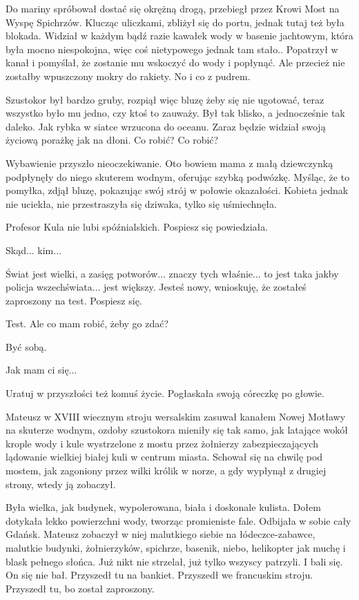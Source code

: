 Do mariny spróbował dostać się okrężną drogą, przebiegł przez Krowi Most na Wyspę Spichrzów.
Klucząc uliczkami, zbliżył się do portu, jednak tutaj też była blokada.
Widział w każdym bądź razie kawałek wody w basenie jachtowym, która była mocno niespokojna, więc coś nietypowego jednak tam stało..
Popatrzył w kanał i pomyślał, że zostanie mu wskoczyć do wody i popłynąć.
Ale przecież nie zostałby wpuszczony mokry do rakiety.
No i co z pudrem.

Szustokor był bardzo gruby, rozpiął więc bluzę żeby się nie ugotować, teraz wszystko było mu jedno, czy ktoś to zauważy.
Był tak blisko, a jednocześnie tak daleko.
Jak rybka w siatce wrzucona do oceanu.
Zaraz będzie widział swoją życiową porażkę jak na dłoni.
Co robić? Co robić?

Wybawienie przyszło nieoczekiwanie.
Oto bowiem mama z małą dziewczynką podpłynęły do niego skuterem wodnym, oferując szybką podwózkę.
Myśląc, że to pomyłka, zdjął bluzę, pokazując swój strój w połowie okazałości.
Kobieta jednak nie uciekła, nie przestraszyła się dziwaka, tylko się uśmiechnęła.

\ds{} Profesor Kula nie lubi spóźnialskich. Pospiesz się \dm{} powiedziała. \de{}

\ds{} Skąd... kim... \de{}

\ds{} Świat jest wielki, a zasięg potworów... znaczy tych właśnie... to jest taka jakby policja wszechświata... jest większy.
Jesteś nowy, wnioskuję, że zostałeś zaproszony na test. Pospiesz się.\de{}

\ds{} Test. Ale co mam robić, żeby go zdać? \de{}

\ds{} Być sobą. \de{}

\ds{} Jak mam ci się... \de{}

\ds{} Uratuj w przyszłości też komuś życie. \dm{} Pogłaskała swoją córeczkę po głowie. \de{}

Mateusz w XVIII wiecznym stroju wersalskim zasuwał kanałem Nowej Motławy na skuterze wodnym, ozdoby szustokora mieniły się tak samo, jak latające wokół 
krople wody i kule wystrzelone z mostu przez żołnierzy zabezpieczających
lądowanie wielkiej białej kuli w centrum miasta. 
Schował się na chwilę pod mostem, jak zagoniony przez wilki królik w norze, a gdy wypłynął z drugiej strony, wtedy ją zobaczył.

Była wielka, jak budynek, wypolerowana, biała i doskonale kulista.
Dołem dotykała lekko powierzchni wody, tworząc promieniste fale.
Odbijała w sobie cały Gdańsk.
Mateusz zobaczył w niej malutkiego siebie na łódeczce-zabawce, malutkie budynki, żołnierzyków, spichrze, basenik, niebo, helikopter jak muchę i blask pełnego słońca.
Już nikt nie strzelał, już tylko wszyscy patrzyli. I bali się.
On się nie bał. Przyszedł tu na bankiet.
Przyszedł we francuskim stroju.
Przyszedł tu, bo został zaproszony.

